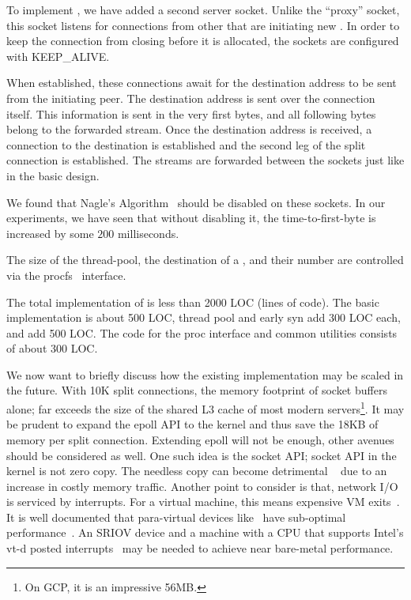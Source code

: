 
To implement \reconn, we have added a second server socket. Unlike the ``proxy'' socket, this socket listens for connections from other \proxies that are initiating new \reconn. In order to keep the connection from closing before it is allocated, the sockets are configured with KEEP\_ALIVE.

When established, these connections await for the destination address to be sent from the initiating peer. The destination address is sent over the connection itself. This information is sent in the very first bytes, and all following bytes belong to the forwarded stream. 
Once the destination address is received, a connection to the destination is established and the second leg of the split connection is established. The streams are forwarded between the sockets just like in the basic design.

We found that Nagle's Algorithm~\cite{nagle} should be disabled on these sockets. In our experiments, we have seen that without disabling it, the time-to-first-byte is increased by some $200$ milliseconds.  

 The size of the thread-pool, the destination of a \reconn, and their number are controlled via the procfs~\cite{proc} interface.

 The total implementation of \oursys is less than 2000 LOC (lines of code). The basic implementation is about 500 LOC, thread pool and early syn add 300 LOC each, and \reconn add 500 LOC. The code for the proc interface and common utilities consists of about 300 LOC.

 We now want to briefly discuss how the existing implementation may be scaled in the future. With 10K split connections, the memory footprint of socket buffers alone; far exceeds the size of the shared L3 cache of most modern servers\footnote{On GCP, it is an impressive 56MB.}. It may be prudent to expand the epoll API to the kernel and thus save the 18KB of memory per split connection. Extending epoll will not be enough, other avenues should be considered as well.
One such idea is the socket API; socket API in the kernel is not zero copy. The needless copy can become detrimental ~\cite{Copy} due to an increase in costly memory traffic. Another point to consider is that, network I/O is serviced by interrupts. For a virtual machine, this means expensive VM exits~\cite{Eli, Elvis}. It is well documented that para-virtual devices like~\cite{virtio,vmxnet3} have sub-optimal performance~\cite{Eli, Elvis}. An SRIOV device and a machine with a CPU that supports Intel's vt-d posted interrupts~\cite{posted} may be needed to achieve near bare-metal performance.